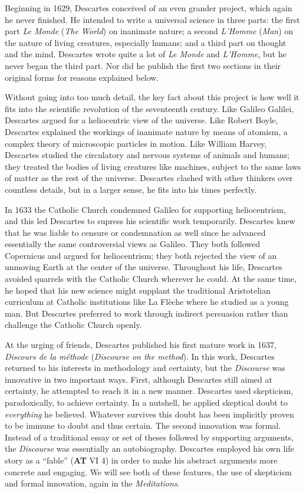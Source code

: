 Beginning in 1629, Descartes conceived of an even grander project, which again he never finished. He intended to write a universal science in three parts: the first part \textit{Le Monde} (\textit{The World}) on inanimate nature; a second \textit{L'Homme} (\textit{Man}) on the nature of living creatures, especially humans; and a third part on thought and the mind. Descartes wrote quite a lot of \textit{Le Monde} and \textit{L'Homme}, but he never began the third part. Nor did he publish the first two sections in their original forms for reasons explained below.

Without going into too much detail, the key fact about this project is how well it fits into the scientific revolution of the seventeenth century. Like Galileo Galilei, Descartes argued for a heliocentric view of the universe. Like Robert Boyle, Descartes explained the workings of inanimate nature by means of atomism, a complex theory of microscopic particles in motion. Like William Harvey, Descartes studied the circulatory and nervous systems of animals and humans; they treated the bodies of living creatures like machines, subject to the same laws of matter as the rest of the universe. Descartes clashed with other thinkers over countless details, but in a larger sense, he fits into his times perfectly.

In 1633 the Catholic Church condemned Galileo for supporting heliocentrism, and this led Descartes to supress his scientific work temporarily. Descartes knew that he was liable to censure or condemnation as well since he advanced essentially the same controversial views as Galileo. They both followed Copernicus and argued for heliocentrism; they both rejected the view of an unmoving Earth at the center of the universe. Throughout his life, Descartes avoided quarrels with the Catholic Church wherever he could. At the same time, he hoped that his new science might supplant the traditional Aristotelian curriculum at Catholic institutions like La Flèche where he studied as a young man. But Descartes preferred to work through indirect persuasion rather than challenge the Catholic Church openly.

At the urging of friends, Descartes published his first mature work in 1637, \textit{Discours de la méthode} (\textit{Discourse on the method}). In this work, Descartes returned to his interests in methodology and certainty, but the \textit{Discourse} was innovative in two important ways. First, although Descartes still aimed at certainty, he attempted to reach it in a new manner. Descartes used skepticism, paradoxically, to achieve certainty. In a nutshell, he applied skeptical doubt to \textit{everything} he believed. Whatever survives this doubt has been implicitly proven to be immune to doubt and thus certain. The second innovation was formal. Instead of a traditional essay or set of theses followed by supporting arguments, the \textit{Discourse} was essentially an autobiography. Descartes employed his own life story as a ``fable'' (\textbf{AT} VI 4) in order to make his abstract arguments more concrete and engaging. We will see both of these features, the use of skepticism and formal innovation, again in the \textit{Meditations}.

